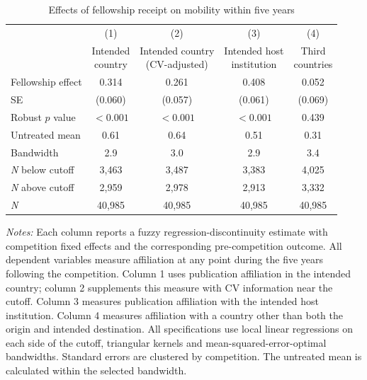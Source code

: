 \begin{table}[!t]
\centering
\begin{minipage}{0.90\textwidth}
\caption{Effects of fellowship receipt on mobility within five years}
\label{tab:mobility_second_specifications}
\footnotesize
\setlength{\tabcolsep}{4pt}
\renewcommand{\arraystretch}{1.05}
\begin{tabular*}{\linewidth}{@{\extracolsep{\fill}}lcccc@{}}
\toprule
& (1) & (2) & (3) & (4) \\
& \shortstack{Intended\\country} & \shortstack{Intended country\\(CV-adjusted)} & \shortstack{Intended host\\institution} & \shortstack{Third\\countries} \\
\midrule
Fellowship effect & 0.314 & 0.261 & 0.408 & 0.052 \\
SE & (0.060) & (0.057) & (0.061) & (0.069) \\
\midrule
Robust $p$ value & $<0.001$ & $<0.001$ & $<0.001$ & 0.439 \\
Untreated mean & 0.61 & 0.64 & 0.51 & 0.31 \\
Bandwidth & 2.9 & 3.0 & 2.9 & 3.4 \\
\textit{N} below cutoff & 3,463 & 3,487 & 3,383 & 4,025 \\
\textit{N} above cutoff & 2,959 & 2,978 & 2,913 & 3,332 \\
\textit{N} & 40,985 & 40,985 & 40,985 & 40,985 \\
\bottomrule
\end{tabular*}
\par\smallskip
\begin{minipage}{\linewidth}
\scriptsize
\textit{Notes:} Each column reports a fuzzy regression-discontinuity estimate with competition fixed effects and the corresponding pre-competition outcome. All dependent variables measure affiliation at any point during the five years following the competition. Column 1 uses publication affiliation in the intended country; column 2 supplements this measure with CV information near the cutoff. Column 3 measures publication affiliation with the intended host institution. Column 4 measures affiliation with a country other than both the origin and intended destination. All specifications use local linear regressions on each side of the cutoff, triangular kernels and mean-squared-error-optimal bandwidths. Standard errors are clustered by competition. The untreated mean is calculated within the selected bandwidth.
\end{minipage}
\end{minipage}
\end{table}
